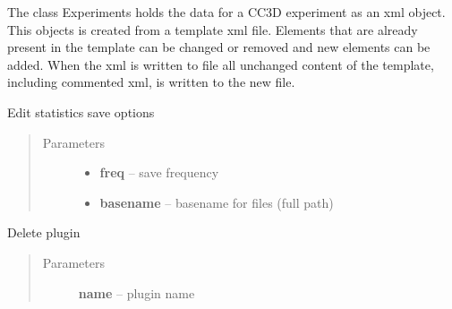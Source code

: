 \documentclass[letterpaper,10pt,english]{sphinxmanual}
\begin{document}
\begin{fulllineitems}
\label{Experiment:Experiment.Experiment}
The class Experiments holds the data for a CC3D experiment as an xml object. This objects is created from a template xml file. Elements that are already present in the template can be changed or removed and new elements can be added. When the xml is written to file all unchanged content of the template, including commented xml, is written to the new file.

\begin{fulllineitems}
\label{Experiment:Experiment.Experiment.addStatistics}
Edit statistics save options
\begin{quote}\begin{description}
\item[{Parameters}] \leavevmode\begin{itemize}
\item {} 
\textbf{freq} -- save frequency

\item {} 
\textbf{basename} -- basename for files (full path)

\end{itemize}

\end{description}\end{quote}

\end{fulllineitems}


\begin{fulllineitems}
\label{Experiment:Experiment.Experiment.deletePlugin}
Delete plugin
\begin{quote}\begin{description}
\item[{Parameters}] \leavevmode
\textbf{name} -- plugin name

\end{description}\end{quote}

\end{fulllineitems}



\end{fulllineitems}
\end{document}
